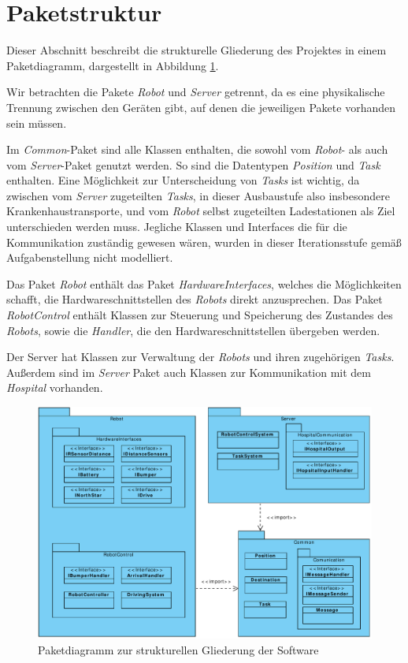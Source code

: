 \section{Paketstruktur}
Dieser Abschnitt beschreibt die strukturelle Gliederung des Projektes in einem Paketdiagramm, dargestellt in Abbildung \ref{Paketstruktur}.

Wir betrachten die Pakete \textit{Robot} und \textit{Server} getrennt, da es eine physikalische Trennung zwischen den Geräten gibt, auf denen die jeweiligen Pakete vorhanden sein müssen.

Im \textit{Common}-Paket sind alle Klassen enthalten, die sowohl vom \textit{Robot}- als auch vom \textit{Server}-Paket genutzt werden. So sind die Datentypen \textit{Position} und \textit{Task} enthalten. Eine Möglichkeit zur Unterscheidung von \textit{Tasks} ist wichtig, da zwischen vom \textit{Server} zugeteilten \textit{Tasks}, in dieser Ausbaustufe also insbesondere Krankenhaustransporte, und vom \textit{Robot} selbst zugeteilten Ladestationen als Ziel unterschieden werden muss. Jegliche Klassen und Interfaces die für die Kommunikation zuständig gewesen wären, wurden in dieser Iterationsstufe gemäß Aufgabenstellung nicht modelliert.

Das Paket \textit{Robot} enthält das Paket \textit{HardwareInterfaces}, welches die Möglichkeiten schafft, die Hardwareschnittstellen des \textit{Robots} direkt anzusprechen. Das Paket \textit{RobotControl} enthält Klassen zur Steuerung und Speicherung des Zustandes des \textit{Robots}, sowie die \emph{Handler}, die den Hardwareschnittstellen übergeben werden.

Der Server hat Klassen zur Verwaltung der \textit{Robots} und ihren zugehörigen \textit{Tasks}. Außerdem sind im \textit{Server} Paket auch Klassen zur Kommunikation mit dem \textit{Hospital} vorhanden.

\begin{figure}[H]
\centering
\includegraphics[height=1\textwidth, angle=90]{img/6_paketdiagramm}
\caption{Paketdiagramm zur strukturellen Gliederung der Software}
\label{Paketstruktur}
\end{figure}
